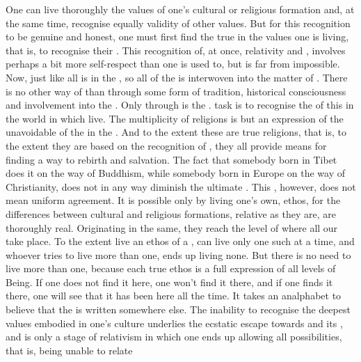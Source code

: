 One can live thoroughly the values of one's cultural or religious formation
and, at the same time, recognise equally validity of other values.  But
for this recognition to be genuine and honest, one must first find the
true  in the values one is living, that is, to recognise
their . This recognition of, at once, relativity and
, involves perhaps a bit more self-respect than one is
used to, but is far from impossible.  Now, just like all  is
 in the , so all  of the  is
interwoven into the matter of . There is no other way of
 than through some form of tradition, historical consciousness
and involvement into the .  Only through  is the
 .  task is to recognise the
 of this  in the world in which  live. The
multiplicity of religions is but an expression of the unavoidable
 of the  in the . And to the extent
these are true religions, that is, to the extent they are based on the
recognition of , they all provide means
for finding a way to rebirth and salvation. The fact that somebody born in Tibet
does it on the way of Buddhism, while somebody born in Europe on the way of
Christianity, does not in any way diminish the ultimate . This
, however, does not mean uniform agreement. It is possible only by
living one's own,  ethos, for the differences between
cultural and religious formations, relative as they are, are thoroughly real.
Originating in the same, they reach the level of  where all our
 take place. To the extent  live an ethos of a ,
 can live only one such at a time, and whoever tries to live more than
one, ends up living none.  But there is no need to live more than one,
because each true ethos is a full expression of all levels of Being. If one
does not find it here, one won't find it there, and if one finds it there, one
will see that it has been here all the time.  It takes an analphabet to believe
that the  is written somewhere else. The inability to recognise the
deepest values embodied in one's culture underlies the ecstatic escape towards
 and its , and is only a stage of relativism 
in which one ends up allowing all possibilities, that is, being unable to relate
